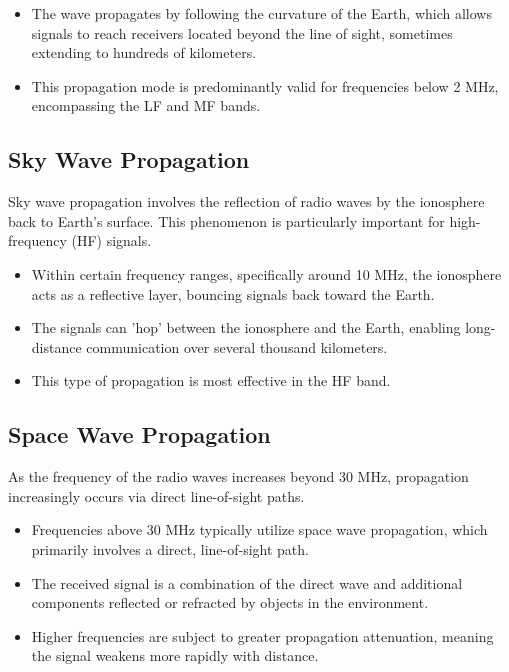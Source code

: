 \begin{itemize}
    \item The wave propagates by following the curvature of the Earth, which allows signals to reach receivers located beyond the line of sight, sometimes extending to hundreds of kilometers.
    \item This propagation mode is predominantly valid for frequencies below 2 MHz, encompassing the LF and MF bands.
\end{itemize}


\subsection*{Sky Wave Propagation}

Sky wave propagation involves the reflection of radio waves by the ionosphere back to Earth's surface. This phenomenon is particularly important for high-frequency (HF) signals.

\begin{itemize}
    \item Within certain frequency ranges, specifically around 10 MHz, the ionosphere acts as a reflective layer, bouncing signals back toward the Earth.
    \item The signals can 'hop' between the ionosphere and the Earth, enabling long-distance communication over several thousand kilometers.
    \item This type of propagation is most effective in the HF band.
\end{itemize}


\subsection*{Space Wave Propagation}

As the frequency of the radio waves increases beyond 30 MHz, propagation increasingly occurs via direct line-of-sight paths.

\begin{itemize}
    \item Frequencies above 30 MHz typically utilize space wave propagation, which primarily involves a direct, line-of-sight path.
    \item The received signal is a combination of the direct wave and additional components reflected or refracted by objects in the environment.
    \item Higher frequencies are subject to greater propagation attenuation, meaning the signal weakens more rapidly with distance.
\end{itemize}





